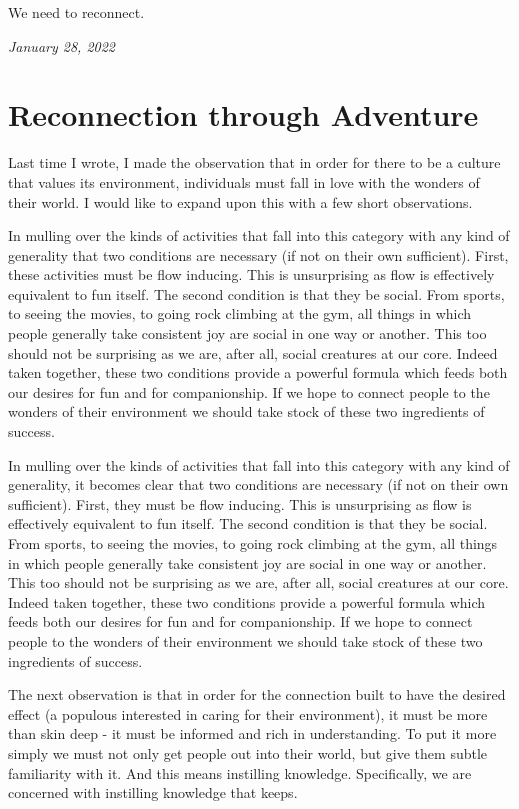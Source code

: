 \documentclass[10pt,a5paper]{book}
\begin{document}
We need to reconnect. 

\textit{January 28, 2022}

\section{Reconnection through Adventure}
Last time I wrote, I made the observation that in order for there to be a culture that values its environment, individuals must fall in love with the wonders of their world. I would like to expand upon this with a few short observations.

In mulling over the kinds of activities that fall into this category with any kind of generality that two conditions are necessary (if not on their own sufficient). First, these activities must be flow inducing. This is unsurprising as flow is effectively equivalent to fun itself. The second condition is that they be social. From sports, to seeing the movies, to going rock climbing at the gym, all things in which people generally take consistent joy are social in one way or another. This too should not be surprising as we are, after all, social creatures at our core. Indeed taken together, these two conditions provide a powerful formula which feeds both our desires for fun and for companionship. If we hope to connect people to the wonders of their environment we should take stock of these two ingredients of success. 

In mulling over the kinds of activities that fall into this category with any kind of generality, it becomes clear that two conditions are necessary (if not on their own sufficient). First, they must be flow inducing. This is unsurprising as flow is effectively equivalent to fun itself. The second condition is that they be social. From sports, to seeing the movies, to going rock climbing at the gym, all things in which people generally take consistent joy are social in one way or another. This too should not be surprising as we are, after all, social creatures at our core. Indeed taken together, these two conditions provide a powerful formula which feeds both our desires for fun and for companionship. If we hope to connect people to the wonders of their environment we should take stock of these two ingredients of success. 

The next observation is that in order for the connection built to have the desired effect (a populous interested in caring for their environment), it must be more than skin deep - it must be informed and rich in understanding. To put it more simply we must not only get people out into their world, but give them subtle familiarity with it. And this means instilling knowledge. Specifically, we are concerned with instilling knowledge that keeps. 
\end{document}
